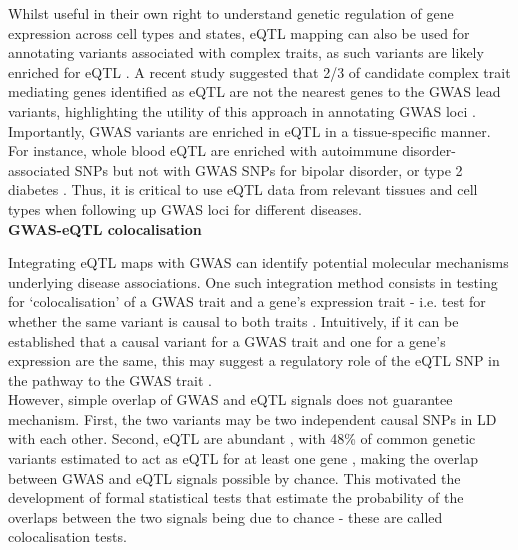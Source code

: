 Whilst useful in their own right to understand genetic regulation of gene expression across cell types and states, eQTL mapping can also be used for annotating variants associated with complex traits, as such variants are likely enriched for eQTL \cite{nicolae2010trait}. 
A recent study suggested that 2/3 of candidate complex trait mediating genes identified as eQTL are not the nearest genes to the GWAS lead variants, highlighting the utility of this approach in annotating GWAS loci \cite{zhu2016integration}. 
Importantly, GWAS variants are enriched in eQTL in a tissue-specific manner. 
For instance, whole blood eQTL are enriched with autoimmune disorder-associated SNPs but not with GWAS SNPs for bipolar disorder, or type 2 diabetes \cite{gtex2015genotype}. 
Thus, it is critical to use eQTL data from relevant tissues and cell types when following up GWAS loci for different diseases.\\

\textbf{GWAS-eQTL colocalisation}

Integrating eQTL maps with GWAS can identify potential molecular mechanisms underlying disease associations.
One such integration method consists in testing for `colocalisation' of a GWAS trait and a gene’s expression trait - i.e. test for whether the same variant is causal to both traits \cite{cannon2018deciphering}.
Intuitively, if it can be established that a causal variant for a GWAS trait and one for a gene’s expression are the same, this may suggest a regulatory role of the eQTL SNP in the pathway to the GWAS trait \cite{he2013sherlock, ongen2017estimating}. \\

However, simple overlap of GWAS and eQTL signals does not guarantee mechanism. 
First, the two variants may be two independent causal SNPs in LD with each other.
Second, eQTL are abundant \cite{lappalainen2013transcriptome}, with 48\% of common genetic variants estimated to act as eQTL for at least one gene \cite{liu2019abundant}, making the overlap between GWAS and eQTL signals possible by chance.
This motivated the development of formal statistical tests that estimate the probability of the overlaps between the two signals being due to chance - these are called colocalisation tests. \\

